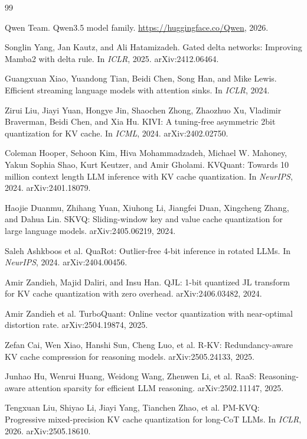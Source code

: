 \documentclass{article}
\begin{document}
\small
\begin{thebibliography}{99}
\setlength{\itemsep}{1pt}

 Qwen Team. Qwen3.5 model family. \url{https://huggingface.co/Qwen}, 2026.

 Songlin Yang, Jan Kautz, and Ali Hatamizadeh. Gated delta networks: Improving Mamba2 with delta rule. In \emph{ICLR}, 2025. arXiv:2412.06464.

 Guangxuan Xiao, Yuandong Tian, Beidi Chen, Song Han, and Mike Lewis. Efficient streaming language models with attention sinks. In \emph{ICLR}, 2024.

 Zirui Liu, Jiayi Yuan, Hongye Jin, Shaochen Zhong, Zhaozhuo Xu, Vladimir Braverman, Beidi Chen, and Xia Hu. KIVI: A tuning-free asymmetric 2bit quantization for KV cache. In \emph{ICML}, 2024. arXiv:2402.02750.

 Coleman Hooper, Sehoon Kim, Hiva Mohammadzadeh, Michael W. Mahoney, Yakun Sophia Shao, Kurt Keutzer, and Amir Gholami. KVQuant: Towards 10 million context length LLM inference with KV cache quantization. In \emph{NeurIPS}, 2024. arXiv:2401.18079.

 Haojie Duanmu, Zhihang Yuan, Xiuhong Li, Jiangfei Duan, Xingcheng Zhang, and Dahua Lin. SKVQ: Sliding-window key and value cache quantization for large language models. arXiv:2405.06219, 2024.

 Saleh Ashkboos et al. QuaRot: Outlier-free 4-bit inference in rotated LLMs. In \emph{NeurIPS}, 2024. arXiv:2404.00456.

 Amir Zandieh, Majid Daliri, and Insu Han. QJL: 1-bit quantized JL transform for KV cache quantization with zero overhead. arXiv:2406.03482, 2024.

 Amir Zandieh et al. TurboQuant: Online vector quantization with near-optimal distortion rate. arXiv:2504.19874, 2025.

 Zefan Cai, Wen Xiao, Hanshi Sun, Cheng Luo, et al. R-KV: Redundancy-aware KV cache compression for reasoning models. arXiv:2505.24133, 2025.

 Junhao Hu, Wenrui Huang, Weidong Wang, Zhenwen Li, et al. RaaS: Reasoning-aware attention sparsity for efficient LLM reasoning. arXiv:2502.11147, 2025.

 Tengxuan Liu, Shiyao Li, Jiayi Yang, Tianchen Zhao, et al. PM-KVQ: Progressive mixed-precision KV cache quantization for long-CoT LLMs. In \emph{ICLR}, 2026. arXiv:2505.18610.


\end{thebibliography}
\end{document}
